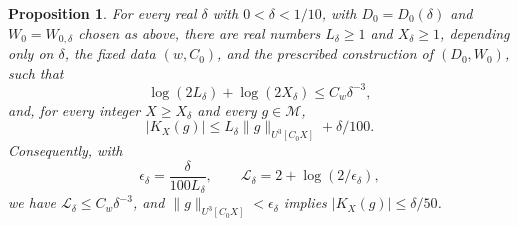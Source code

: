 \documentclass[twoside]{aomart}
\theoremstyle{paperplain}
\newtheorem{proposition}[theorem]{Proposition}
\theoremstyle{paperdefinition}
\numberwithin{equation}{section}
\begin{document}
\begin{samepage}
\begin{proposition}\label{tr:uniform-estimate}
For every real $\delta$ with $0<\delta<1/10$, with
$D_0=D_0(\delta)$ and $W_0=W_{0,\delta}$ chosen as above, there are
real numbers $L_\delta\ge1$ and $X_\delta\ge1$, depending only on
$\delta$, the fixed data $(w,C_0)$, and the prescribed construction of
$(D_0,W_0)$, such that
\begin{equation}
 \log(2L_\delta)+\log(2X_\delta)\le C_w\delta^{-3},
 \label{tr:uniform-constants}
\end{equation}
and, for every integer $X\ge X_\delta$ and every $g\in\mathcal M$,
\begin{equation}
 |K_X(g)|\le L_\delta\|g\|_{U^3[C_0X]}+\delta/100.
 \label{tr:uniform-bound}
\end{equation}
Consequently, with
\begin{equation*}
 \epsilon_\delta=\frac{\delta}{100L_\delta},
 \qquad \mathcal L_\delta=2+\log(2/\epsilon_\delta),
\end{equation*}
we have $\mathcal L_\delta\le C_w\delta^{-3}$, and
$\|g\|_{U^3[C_0X]}<\epsilon_\delta$ implies
$|K_X(g)|\le\delta/50$.
\end{proposition}

\end{samepage}
\end{document}
